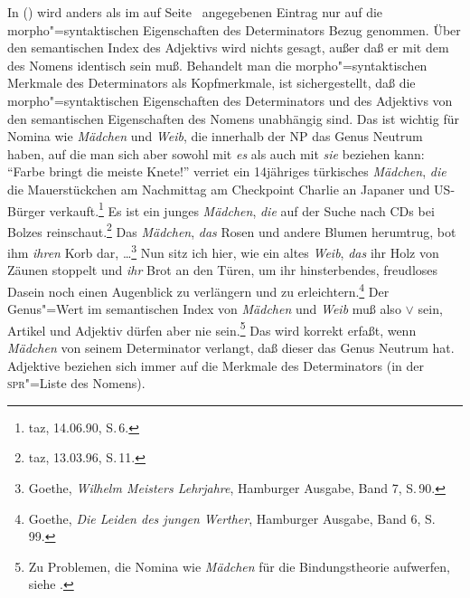 \noindent
In () wird anders als im auf Seite~\pageref{le-interessantes-sem}
angegebenen Eintrag nur auf die morpho"=syntaktischen Eigenschaften des Determinators Bezug genommen.
Über den semantischen Index des Adjektivs wird nichts gesagt, außer daß er mit dem des Nomens
identisch sein muß. Behandelt man die morpho"=syntaktischen Merkmale des Determinators als
Kopfmerkmale, ist sichergestellt, daß die morpho"=syntaktischen Eigenschaften
des Determinators und des Adjektivs von den semantischen Eigenschaften des Nomens unabhängig sind.
Das ist wichtig für Nomina wie \emph{Mädchen} und \emph{Weib}, die innerhalb der NP das Genus Neutrum
haben, auf die man sich aber sowohl mit \emph{es} als auch mit \emph{sie} beziehen kann:
\eal
\ex "`Farbe bringt die meiste Knete!"' verriet ein 14jähriges türkisches {\em Mädchen\/}, {\em die\/} die Mauerstückchen am
      Nachmittag am Checkpoint Charlie an Japaner und US-Bürger verkauft.\footnote{
        taz, 14.06.90, S.\,6.
      }
\ex Es ist ein junges {\em Mädchen\/}, {\em die\/} auf der Suche nach CDs bei Bolzes reinschaut.\footnote{
        taz, 13.03.96, S.\,11.
      }
\zl
\eal
\label{bsp-neu-neu-goethe}
\ex Das {\em Mädchen\/}, {\em das\/} Rosen und andere Blumen herumtrug, bot ihm \emph{ihren} Korb
dar, \ldots\footnote{
        Goethe, {\em Wilhelm Meisters Lehrjahre\/}, Hamburger Ausgabe, Band 7, S.\,90.
      }
\ex Nun sitz ich hier, wie ein altes {\em Weib\/}, {\em das\/} ihr Holz von Zäunen stoppelt
      und \emph{ihr} Brot an den Türen, um ihr hinsterbendes, freudloses Dasein noch einen
      Augenblick zu verlängern und zu erleichtern.\footnote{
        Goethe, {\em Die Leiden des jungen Werther\/}, Hamburger Ausgabe, Band 6, S.\,99.
      }\label{bsp-goethe-altes-weib}
\zl
Der Genus"=Wert im semantischen Index von \emph{Mädchen} und \emph{Weib} muß also  $\vee$  sein, Artikel
und Adjektiv dürfen aber nie  sein.\footnote{
  Zu Problemen, die Nomina wie \emph{Mädchen} für die Bindungstheorie aufwerfen,
  siehe .%
}
Das wird korrekt erfaßt, wenn \emph{Mädchen} von seinem Determinator verlangt,
daß dieser das Genus Neutrum hat. Adjektive beziehen sich immer auf die Merkmale des Determinators (in der \textsc{spr}"=Liste
des Nomens).

